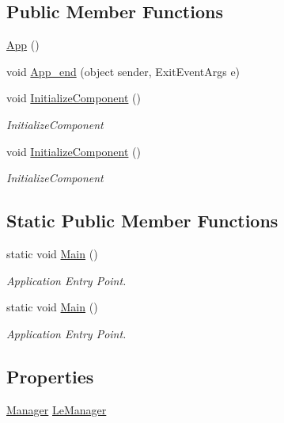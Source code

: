 \subsection*{Public Member Functions}
\begin{DoxyCompactItemize}
\item 
\hyperlink{classnewPizza1_1_1App_aa51871ad89d5c680db7878c58c80e98e}{App} ()
\item 
void \hyperlink{classnewPizza1_1_1App_adb889537b1e18b9309daa743947fd0db}{App\+\_\+end} (object sender, Exit\+Event\+Args e)
\item 
void \hyperlink{classnewPizza1_1_1App_a437c6582c386ee3f9ee1419133aae6be}{Initialize\+Component} ()
\begin{DoxyCompactList}\small\item\em Initialize\+Component \end{DoxyCompactList}\item 
void \hyperlink{classnewPizza1_1_1App_a437c6582c386ee3f9ee1419133aae6be}{Initialize\+Component} ()
\begin{DoxyCompactList}\small\item\em Initialize\+Component \end{DoxyCompactList}\end{DoxyCompactItemize}
\subsection*{Static Public Member Functions}
\begin{DoxyCompactItemize}
\item 
static void \hyperlink{classnewPizza1_1_1App_ab05f0e942749365a0b09024da23f09c4}{Main} ()
\begin{DoxyCompactList}\small\item\em Application Entry Point. \end{DoxyCompactList}\item 
static void \hyperlink{classnewPizza1_1_1App_ab05f0e942749365a0b09024da23f09c4}{Main} ()
\begin{DoxyCompactList}\small\item\em Application Entry Point. \end{DoxyCompactList}\end{DoxyCompactItemize}
\subsection*{Properties}
\begin{DoxyCompactItemize}
\item 
\hyperlink{classModele_1_1Manager}{Manager} \hyperlink{classnewPizza1_1_1App_a40f3adef1e0176c5730f8d9ba525c010}{Le\+Manager}
\end{DoxyCompactItemize}


